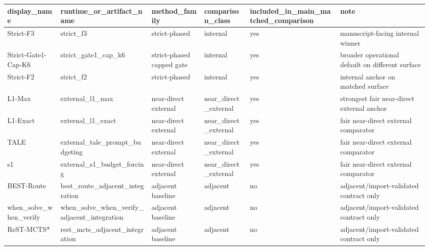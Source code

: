 \begin{tabular}{llllll}
\hline
display\_name & runtime\_or\_artifact\_name & method\_family & comparison\_class & included\_in\_main\_matched\_comparison & note \\
\hline
Strict-F3 & strict\_f3 & strict-phased & internal & yes & manuscript-facing internal winner \\
Strict-Gate1-Cap-K6 & strict\_gate1\_cap\_k6 & strict-phased capped gate & internal & yes & broader operational default on different surface \\
Strict-F2 & strict\_f2 & strict-phased & internal & yes & internal anchor on matched surface \\
L1-Max & external\_l1\_max & near-direct external & near\_direct\_external & yes & strongest fair near-direct external anchor \\
L1-Exact & external\_l1\_exact & near-direct external & near\_direct\_external & yes & fair near-direct external comparator \\
TALE & external\_tale\_prompt\_budgeting & near-direct external & near\_direct\_external & yes & fair near-direct external comparator \\
s1 & external\_s1\_budget\_forcing & near-direct external & near\_direct\_external & yes & fair near-direct external comparator \\
BEST-Route & best\_route\_adjacent\_integration & adjacent baseline & adjacent & no & adjacent/import-validated contract only \\
when\_solve\_when\_verify & when\_solve\_when\_verify\_adjacent\_integration & adjacent baseline & adjacent & no & adjacent/import-validated contract only \\
ReST-MCTS* & rest\_mcts\_adjacent\_integration & adjacent baseline & adjacent & no & adjacent/import-validated contract only \\
\hline
\end{tabular}

